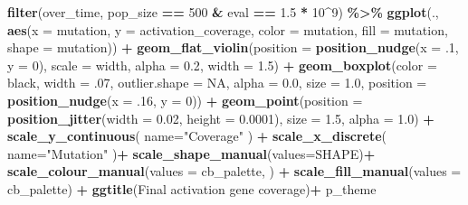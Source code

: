\documentclass[
]{book}
\newenvironment{Shaded}{\begin{snugshade}}{\end{snugshade}}
\newcommand{\AttributeTok}[1]{\textcolor[rgb]{0.13,0.29,0.53}{#1}}
\newcommand{\ConstantTok}[1]{\textcolor[rgb]{0.56,0.35,0.01}{#1}}
\newcommand{\DecValTok}[1]{\textcolor[rgb]{0.00,0.00,0.81}{#1}}
\newcommand{\FloatTok}[1]{\textcolor[rgb]{0.00,0.00,0.81}{#1}}
\newcommand{\FunctionTok}[1]{\textcolor[rgb]{0.13,0.29,0.53}{\textbf{#1}}}
\newcommand{\NormalTok}[1]{#1}
\newcommand{\SpecialCharTok}[1]{\textcolor[rgb]{0.81,0.36,0.00}{\textbf{#1}}}
\newcommand{\StringTok}[1]{\textcolor[rgb]{0.31,0.60,0.02}{#1}}
\begin{document}
\begin{Shaded}
\begin{Highlighting}[]
\FunctionTok{filter}\NormalTok{(over\_time, pop\_size }\SpecialCharTok{==} \DecValTok{500} \SpecialCharTok{\&}\NormalTok{ eval }\SpecialCharTok{==} \FloatTok{1.5} \SpecialCharTok{*} \DecValTok{10}\SpecialCharTok{\^{}}\DecValTok{9}\NormalTok{) }\SpecialCharTok{\%\textgreater{}\%}
  \FunctionTok{ggplot}\NormalTok{(., }\FunctionTok{aes}\NormalTok{(}\AttributeTok{x =}\NormalTok{ mutation, }\AttributeTok{y =}\NormalTok{ activation\_coverage, }\AttributeTok{color =}\NormalTok{ mutation, }\AttributeTok{fill =}\NormalTok{ mutation, }\AttributeTok{shape =}\NormalTok{ mutation)) }\SpecialCharTok{+}
  \FunctionTok{geom\_flat\_violin}\NormalTok{(}\AttributeTok{position =} \FunctionTok{position\_nudge}\NormalTok{(}\AttributeTok{x =}\NormalTok{ .}\DecValTok{1}\NormalTok{, }\AttributeTok{y =} \DecValTok{0}\NormalTok{), }\AttributeTok{scale =} \StringTok{\textquotesingle{}width\textquotesingle{}}\NormalTok{, }\AttributeTok{alpha =} \FloatTok{0.2}\NormalTok{, }\AttributeTok{width =} \FloatTok{1.5}\NormalTok{) }\SpecialCharTok{+}
  \FunctionTok{geom\_boxplot}\NormalTok{(}\AttributeTok{color =} \StringTok{\textquotesingle{}black\textquotesingle{}}\NormalTok{, }\AttributeTok{width =}\NormalTok{ .}\DecValTok{07}\NormalTok{, }\AttributeTok{outlier.shape =} \ConstantTok{NA}\NormalTok{, }\AttributeTok{alpha =} \FloatTok{0.0}\NormalTok{, }\AttributeTok{size =} \FloatTok{1.0}\NormalTok{, }\AttributeTok{position =} \FunctionTok{position\_nudge}\NormalTok{(}\AttributeTok{x =}\NormalTok{ .}\DecValTok{16}\NormalTok{, }\AttributeTok{y =} \DecValTok{0}\NormalTok{)) }\SpecialCharTok{+}
  \FunctionTok{geom\_point}\NormalTok{(}\AttributeTok{position =} \FunctionTok{position\_jitter}\NormalTok{(}\AttributeTok{width =} \FloatTok{0.02}\NormalTok{, }\AttributeTok{height =} \FloatTok{0.0001}\NormalTok{), }\AttributeTok{size =} \FloatTok{1.5}\NormalTok{, }\AttributeTok{alpha =} \FloatTok{1.0}\NormalTok{) }\SpecialCharTok{+}
  \FunctionTok{scale\_y\_continuous}\NormalTok{(}
    \AttributeTok{name=}\StringTok{"Coverage"}
\NormalTok{  ) }\SpecialCharTok{+}
  \FunctionTok{scale\_x\_discrete}\NormalTok{(}
    \AttributeTok{name=}\StringTok{"Mutation"}
\NormalTok{  )}\SpecialCharTok{+}
  \FunctionTok{scale\_shape\_manual}\NormalTok{(}\AttributeTok{values=}\NormalTok{SHAPE)}\SpecialCharTok{+}
  \FunctionTok{scale\_colour\_manual}\NormalTok{(}\AttributeTok{values =}\NormalTok{ cb\_palette, ) }\SpecialCharTok{+}
  \FunctionTok{scale\_fill\_manual}\NormalTok{(}\AttributeTok{values =}\NormalTok{ cb\_palette) }\SpecialCharTok{+}
  \FunctionTok{ggtitle}\NormalTok{(}\StringTok{\textquotesingle{}Final activation gene coverage\textquotesingle{}}\NormalTok{)}\SpecialCharTok{+}
\NormalTok{  p\_theme}
\end{Highlighting}
\end{Shaded}
\end{document}

